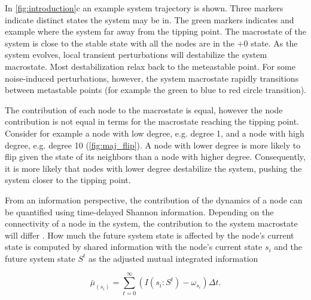 \documentclass[a4paper, 11pt, twocolumn]{article}
\begin{document}
In \cref{fig:introduction}c an example system trajectory is shown. Three markers indicate distinct states the system may be in. The green markers indicates and example where the system far away from the tipping point. The macrostate of the system is close to the stable state with all the nodes are in the +0 state. As the system evolves, local transient perturbations will destabilize the system macrostate. Most destabilization relax back to the meteastable point. For some noise-induced perturbations, however, the system macrostate rapidly transitions between metastable points (for example the green to blue to red circle transition).

The contribution of each node to the macrostate is equal, however the node contribution is not equal in terms for the macrostate reaching the tipping point. Consider for example a node with low degree, e.g. degree 1, and a node with high degree, e.g. degree 10 (\cref{fig:maj_flip}). A node with lower degree is more likely to flip given the state of its neighbors than a node with higher degree. Consequently, it is more likely that nodes with lower degree destabilize the system, pushing the system closer to the tipping point.


From an information perspective, the contribution of the dynamics of a node can be quantified using time-delayed Shannon information. Depending on the connectivity of a node in the system, the contribution to the system macrostate will differ \cite{vanElteren2022,Quax2013}. How much the future system state is affected by the node's current state is computed by shared information with the node's current state $s_i$ and the future system state $S^t$ as the adjusted mutual integrated information

\begin{equation}
\label{eq:adj_imi}
\bar \mu_(s_i) = \sum_{t = 0}^\infty (I(s_i : S^t) - \omega_{s_i}) \Delta t.
\end{equation}
\end{document}
